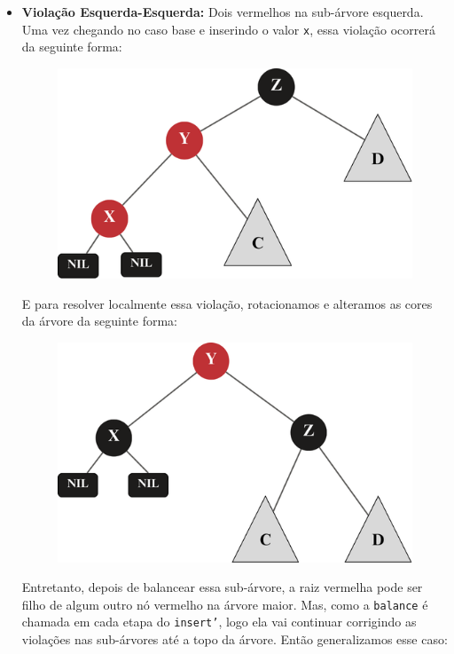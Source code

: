 \begin{itemize}
	\item \textbf{Violação Esquerda-Esquerda:} Dois vermelhos na sub-árvore esquerda. \\
	      Uma vez chegando no caso base e inserindo o valor \texttt{x}, essa violação ocorrerá da seguinte forma:
	      \begin{figure}[!ht]
		      \centering
		      \includegraphics[scale=0.5]{figures/rubro-negra/left-left-insertion.png}
		      \caption{}
	      \end{figure}
	      \FloatBarrier
	      E para resolver localmente essa violação, rotacionamos e alteramos as cores da árvore da seguinte forma:
	      \begin{figure}[!ht]
		      \centering
		      \includegraphics[scale=0.5]{figures/rubro-negra/left-left-base-solution.png}
		      \caption{}
	      \end{figure}
	      \FloatBarrier
	      Entretanto, depois de balancear essa sub-árvore, a raiz vermelha pode ser filho de algum outro nó vermelho na árvore maior. Mas, como a \texttt{balance} é chamada em cada etapa do \texttt{insert'}, logo ela vai continuar corrigindo as violações nas sub-árvores até a topo da árvore. Então generalizamos esse caso:

\end{itemize}
